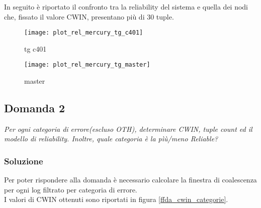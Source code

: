 In seguito è riportato il confronto tra la reliability del sistema e quella dei
nodi che, fissato il valore CWIN, presentano più di 30 tuple.\\

\begin{minipage}{\linewidth}
  \centering
  \begin{minipage}{.49\linewidth}
    \begin{figure}[H]
      \texttt{[image: plot\_rel\_mercury\_tg\_c401]}
      \caption*{tg c401}
    \end{figure}
  \end{minipage}
  \begin{minipage}{.49\linewidth}
    \begin{figure}[H]
      \texttt{[image: plot\_rel\_mercury\_tg\_master]}
      \caption*{master}
    \end{figure}
  \end{minipage}
\end{minipage}

\clearpage

\subsection{Domanda 2}
\textit{Per ogni categoria di errore(escluso OTH), determinare CWIN, tuple count
ed il modello di reliability.
Inoltre, quale categoria è la pìù/meno Reliable?}

\subsubsection*{Soluzione}
Per poter rispondere alla domanda è necessario calcolare la finestra di coalescenza
per ogni log filtrato per categoria di errore.\\
I valori di CWIN ottenuti sono riportati in figura \ref{ffda_cwin_categorie}.\\

